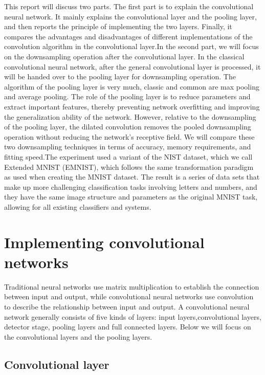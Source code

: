 \documentclass{article}
\begin{document}
This report will discuss two parts. The first part is to explain the convolutional neural network. It mainly explains the convolutional layer and the pooling layer, and then reports the principle of implementing the two layers. Finally, it compares the advantages and disadvantages of different implementations of the convolution algorithm in the convolutional layer.In the second part, we will focus on the downsampling operation after the convolutional layer. In the classical convolutional neural network, after the general convolutional layer is processed, it will be handed over to the pooling layer for downsampling operation. The algorithm of the pooling layer is very much, classic and common are max pooling and average pooling. The role of the pooling layer is to reduce parameters and extract important features, thereby preventing network overfitting and improving the generalization ability of the network. However, relative to the downsampling of the pooling layer, the dilated convolution removes the pooled downsampling operation without reducing the network's receptive field. We will compare these two downsampling techniques in terms of accuracy, memory requirements, and fitting speed.The experiment used a variant of the NIST dataset, which we call Extended MNIST (EMNIST), which follows the same transformation paradigm as used when creating the MNIST dataset. The result is a series of data sets that make up more challenging classification tasks involving letters and numbers, and they have the same image structure and parameters as the original MNIST task, allowing for all existing classifiers and systems. 

\section{Implementing convolutional networks} 

Traditional neural networks use matrix multiplication to establish the connection between input and output, while convolutional neural networks use convolution to describe the relationship between input and output.
A convolutional neural network generally consists of five kinds of layers: input layers,convolutional layers, detector stage, pooling layers and  full connected layers. Below we will focus on the convolutional layers and the pooling layers.

\subsection{Convolutional layer}
\end{document}
